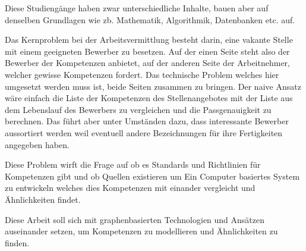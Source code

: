 Diese Studiengänge haben zwar unterschiedliche Inhalte, bauen aber auf denselben Grundlagen wie zb. Mathematik, Algorithmik, Datenbanken etc. auf. 

Das Kernproblem bei der Arbeitsvermittlung besteht darin, eine vakante Stelle mit einem geeigneten Bewerber zu besetzen. Auf der einen Seite steht also der Bewerber der Kompetenzen anbietet, auf der anderen Seite der Arbeitnehmer, welcher gewisse Kompetenzen fordert. Das technische Problem welches hier umgesetzt werden muss ist, beide Seiten zusammen zu bringen. Der naive Ansatz wäre einfach die Liste der Kompetenzen des Stellenangebotes mit der Liste aus dem Lebenslauf des Bewerbers zu vergleichen und die Passgenauigkeit zu berechnen. Das führt aber unter Umständen dazu, dass interessante Bewerber aussortiert werden weil eventuell andere Bezeichnungen für ihre Fertigkeiten angegeben haben. 

Diese Problem wirft die Frage auf ob es Standards und Richtlinien für Kompetenzen gibt und ob Quellen existieren um Ein Computer basiertes System zu entwickeln welches dies Kompetenzen mit einander vergleicht und Ähnlichkeiten findet. 

Diese Arbeit soll sich mit graphenbasierten Technologien und Ansätzen auseinander setzen, um Kompetenzen zu modellieren und Ähnlichkeiten zu finden.

